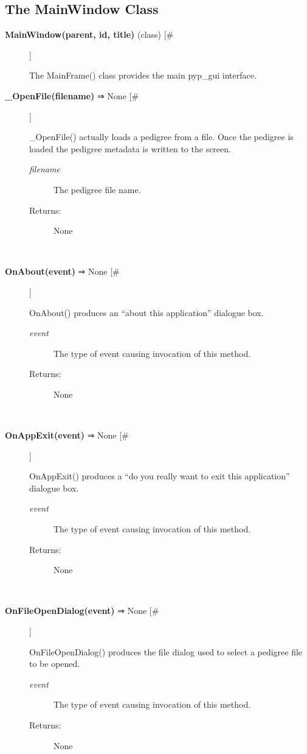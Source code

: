\subsection*{The MainWindow Class}
\begin{description}
\item[\textbf{MainWindow(parent, id, title)}
 (class) [\#]]

 The MainFrame() class provides the main pyp\_gui interface.

\item[\textbf{\_OpenFile(filename)}
 ⇒ None [\#]]

 \_OpenFile() actually loads a pedigree from a file. Once the pedigree is loaded the pedigree metadata is written to the screen.
\begin{description}
\item[\emph{filename}
] The pedigree file name.
\item[Returns:] None

\end{description}
\\ 

\item[\textbf{OnAbout(event)}
 ⇒ None [\#]]

 OnAbout() produces an ``about this application'' dialogue box.
\begin{description}
\item[\emph{event}
] The type of event causing invocation of this method.
\item[Returns:] None

\end{description}
\\ 

\item[\textbf{OnAppExit(event)}
 ⇒ None [\#]]

 OnAppExit() produces a ``do you really want to exit this application'' dialogue box.
\begin{description}
\item[\emph{event}
] The type of event causing invocation of this method.
\item[Returns:] None

\end{description}
\\ 

\item[\textbf{OnFileOpenDialog(event)}
 ⇒ None [\#]]

 OnFileOpenDialog() produces the file dialog used to select a pedigree file to be opened.
\begin{description}
\item[\emph{event}
] The type of event causing invocation of this method.
\item[Returns:] None


\end{description}
\end{description}
